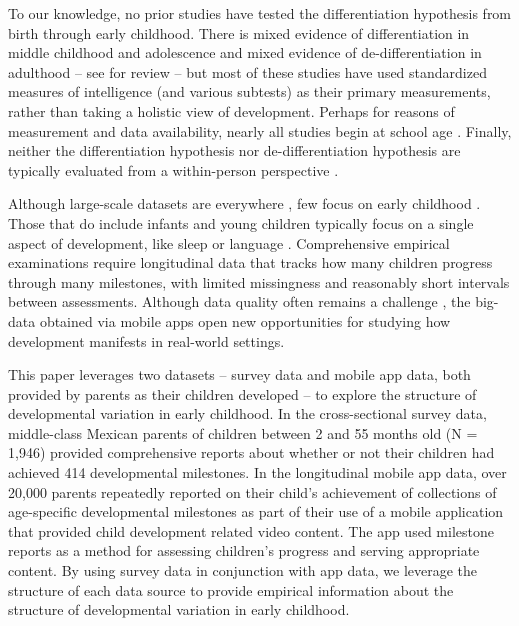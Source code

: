 \documentclass[man, floatsintext]{apa7}
\begin{document}
To our knowledge, no prior studies have tested the differentiation hypothesis from birth through early childhood. There is mixed evidence of differentiation in middle childhood and adolescence \parencite[e.g.,][]{juan-espinosa2006,shing2010,breit2020}
and mixed evidence of de-differentiation in adulthood \parencite[e.g.,][]{hartung2018,li2004} -- see \cite{breit2021} for review -- but most of these studies have used standardized measures of intelligence (and various subtests) as their primary measurements, rather than taking a holistic view of development. Perhaps for reasons of measurement and data availability, nearly all studies begin at school age \parencite[see][table 2]{breit2021}. Finally, neither the differentiation hypothesis nor de-differentiation hypothesis are typically evaluated from a  within-person perspective \parencite[see][as an exception]{hulur2015}.

Although large-scale datasets are everywhere \parencite{tsai2015}, few
focus on early childhood \parencite[cf.][]{mindell2016,milne-ives2020}.  Those that do include infants and young children typically focus on a single aspect of development, like sleep \parencite{mindell2016} or language \parencite{frank2021}. Comprehensive empirical
examinations require longitudinal data that tracks how many children
progress through many milestones, with limited missingness and
reasonably short intervals between assessments. Although data quality often remains a
challenge \parencite{milne-ives2020}, the big-data obtained
via mobile apps open new opportunities for studying how development
manifests in real-world settings.

This paper leverages two datasets -- survey data and mobile app data, both provided by parents as their children developed -- to explore
the structure of developmental variation in early childhood. In the
cross-sectional survey data, middle-class Mexican parents of children
between 2 and 55 months old (N = 1,946) provided comprehensive reports
about whether or not their children had achieved 414 developmental
milestones. In the longitudinal mobile app data, over 20,000 parents
repeatedly reported on their child's achievement of collections of
age-specific developmental milestones as part of their use of a mobile
application that provided child development related video content. The
app used milestone reports as a method for assessing children's progress
and serving appropriate content. By using survey data in conjunction
with app data, we leverage the structure of each data source to provide
empirical information about the structure of developmental variation
in early childhood.
\end{document}
